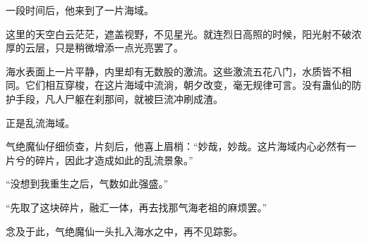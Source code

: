 \begin{this_body}
一段时间后，他来到了一片海域。

这里的天空白云茫茫，遮盖视野，不见星光。就连烈日高照的时候，阳光射不破浓厚的云层，只是稍微增添一点光亮罢了。

海水表面上一片平静，内里却有无数股的激流。这些激流五花八门，水质皆不相同。它们相互穿梭，在这片海域中流淌，朝夕改变，毫无规律可言。没有蛊仙的防护手段，凡人尸躯在刹那间，就被巨流冲刷成渣。

正是乱流海域。

气绝魔仙仔细侦查，片刻后，他喜上眉梢：“妙哉，妙哉。这片海域内心必然有一片兮的碎片，因此才造成如此的乱流景象。”

“没想到我重生之后，气数如此强盛。”

“先取了这块碎片，融汇一体，再去找那气海老祖的麻烦罢。”

念及于此，气绝魔仙一头扎入海水之中，再不见踪影。

\end{this_body}

